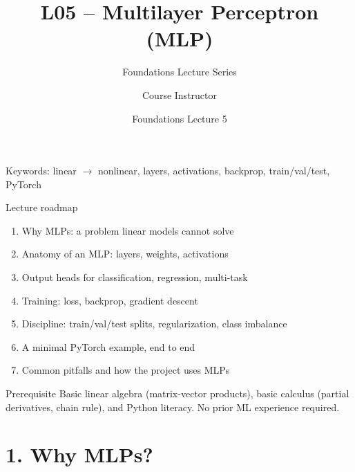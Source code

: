 \documentclass[aspectratio=169,10pt]{beamer}
\title[L05: MLP]{L05 -- Multilayer Perceptron (MLP)}
\subtitle{Foundations Lecture Series}
\author{Course Instructor}
\institute{Microgrid 3-phase Security AI Project}
\date{Foundations Lecture 5}
\begin{document}
\begin{frame}
  \titlepage
  \vspace{-0.8em}
  \begin{center}
    \small Keywords: linear $\to$ nonlinear, layers, activations, backprop, train/val/test, PyTorch
  \end{center}
\end{frame}

\begin{frame}{Lecture roadmap}
\begin{enumerate}
  \item Why MLPs: a problem linear models cannot solve
  \item Anatomy of an MLP: layers, weights, activations
  \item Output heads for classification, regression, multi-task
  \item Training: loss, backprop, gradient descent
  \item Discipline: train/val/test splits, regularization, class imbalance
  \item A minimal PyTorch example, end to end
  \item Common pitfalls and how the project uses MLPs
\end{enumerate}
\vspace{0.6em}
\begin{block}{Prerequisite}
Basic linear algebra (matrix-vector products), basic calculus (partial derivatives, chain rule), and Python literacy. No prior ML experience required.
\end{block}
\end{frame}

\section*{1. Why MLPs?}
\end{document}
